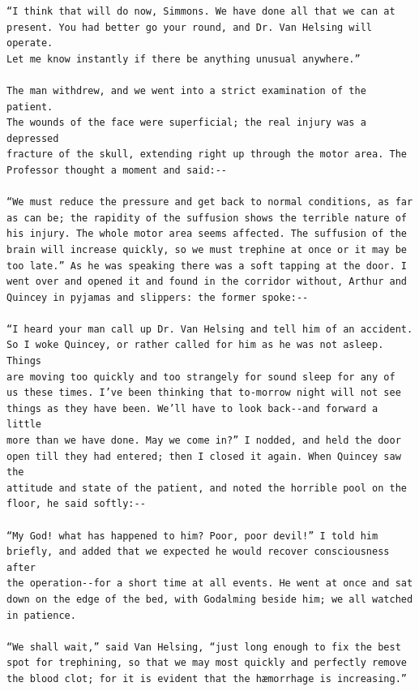 \documentclass{article}
\begin{document}
\begin{verbatim}
“I think that will do now, Simmons. We have done all that we can at
present. You had better go your round, and Dr. Van Helsing will operate.
Let me know instantly if there be anything unusual anywhere.”

The man withdrew, and we went into a strict examination of the patient.
The wounds of the face were superficial; the real injury was a depressed
fracture of the skull, extending right up through the motor area. The
Professor thought a moment and said:--

“We must reduce the pressure and get back to normal conditions, as far
as can be; the rapidity of the suffusion shows the terrible nature of
his injury. The whole motor area seems affected. The suffusion of the
brain will increase quickly, so we must trephine at once or it may be
too late.” As he was speaking there was a soft tapping at the door. I
went over and opened it and found in the corridor without, Arthur and
Quincey in pyjamas and slippers: the former spoke:--

“I heard your man call up Dr. Van Helsing and tell him of an accident.
So I woke Quincey, or rather called for him as he was not asleep. Things
are moving too quickly and too strangely for sound sleep for any of
us these times. I’ve been thinking that to-morrow night will not see
things as they have been. We’ll have to look back--and forward a little
more than we have done. May we come in?” I nodded, and held the door
open till they had entered; then I closed it again. When Quincey saw the
attitude and state of the patient, and noted the horrible pool on the
floor, he said softly:--

“My God! what has happened to him? Poor, poor devil!” I told him
briefly, and added that we expected he would recover consciousness after
the operation--for a short time at all events. He went at once and sat
down on the edge of the bed, with Godalming beside him; we all watched
in patience.

“We shall wait,” said Van Helsing, “just long enough to fix the best
spot for trephining, so that we may most quickly and perfectly remove
the blood clot; for it is evident that the hæmorrhage is increasing.”


\end{verbatim}
\end{document}
